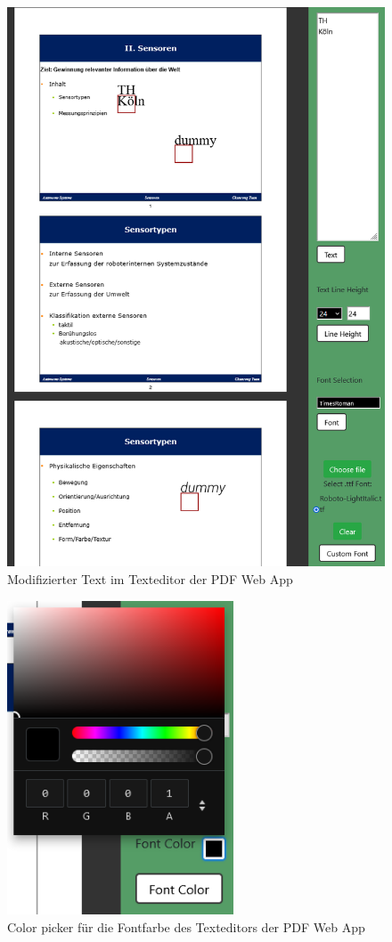 \begin{figure}[!htbp]
	\centering
	\includegraphics[width=1\textwidth]{"images/texteditor3.png"}
	\caption{Modifizierter Text im Texteditor der PDF Web App}
	\label{fig:texteditor3}
\end{figure}

\begin{figure}[!htbp]
	\centering
	\includegraphics[width=0.6\textwidth]{"images/fontcolor.png"}
	\caption{Color picker für die Fontfarbe des Texteditors der PDF Web App}
	\label{fig:fontcolor}
\end{figure}